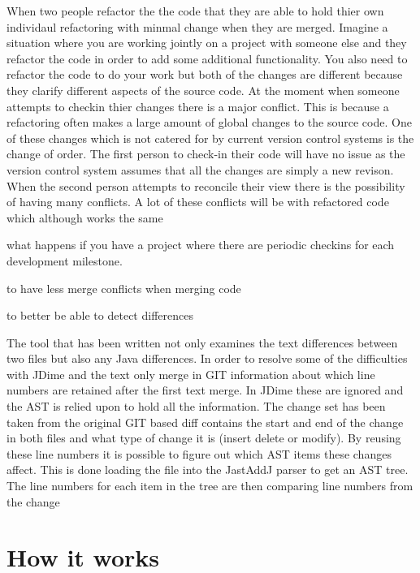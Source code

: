 When two people refactor the the code that they are able to hold thier own individaul refactoring with minmal change when they are merged.
Imagine  a situation where you are working jointly on a project with someone else and they refactor the code in order to add some additional functionality.  You also need to refactor the code to do your work but both of the changes are different because they clarify different aspects of the source code.  At the moment when someone attempts to checkin thier changes there is a major conflict.  This is because a refactoring often makes a large amount of global changes to the source code.  One of these changes which is not catered for by current version control systems is the change of order.  The first person to check-in their code will have no issue as the version control system assumes that all the changes are simply a new revison.  When the second person attempts to reconcile their view there is the possibility of having many conflicts.  A lot of these conflicts will be with refactored code which although works the same 

what happens if you have a project where there are periodic checkins for each development milestone.   


to have less merge conflicts when merging code 

to better be able to detect differences

The tool that has been written not only examines the text differences between two files but also any Java differences. In order to resolve some of the difficulties with JDime and  the text only merge in GIT information about which line numbers are retained after the first text merge.  In JDime these are ignored and the AST is relied upon to hold all the information.  The change set has been taken from the original GIT based diff contains the start and end of the change in both files and what type of change it is (insert delete or modify).  By reusing these line numbers it is possible to figure out which AST items these changes affect. This is done loading the file into the JastAddJ parser to get an AST tree. The line numbers for each item in the tree are then comparing line numbers from the change

\section{How it works}

